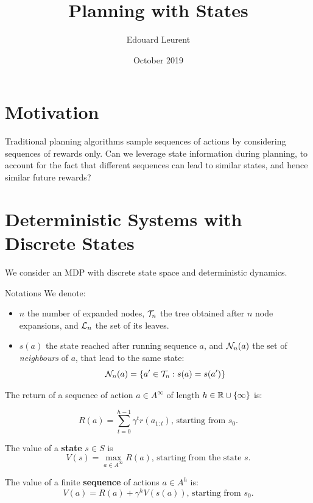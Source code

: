 \documentclass{article}
\title{Planning with States}
\author{Edouard Leurent}
\date{October 2019}
\begin{document}
\maketitle

\tableofcontents

\section{Motivation}

Traditional planning algorithms sample sequences of actions by considering sequences of rewards only. Can we leverage state information during planning, to account for the fact that different sequences can lead to similar states, and hence similar future rewards?

\section{Deterministic Systems with Discrete States}

We consider an MDP with discrete state space and deterministic dynamics.

\begin{paragraph}{Notations}
We denote:
\begin{itemize}
\item $n$ the number of expanded nodes, $\mathcal{T}_n$ the tree obtained after $n$ node expansions, and $\mathcal{L}_n$ the set of its leaves.
    \item $s(a)$ the state reached after running sequence $a$, and $\mathcal{N}_n(a)$ the set of \emph{neighbours} of $a$, that lead to the same state:  \[\mathcal{N}_n(a) = \{a'\in\mathcal{T}_n: s(a)=s(a')\}\]
\end{itemize}
\end{paragraph}

\begin{definition}[Values]
The return of a sequence of action $a\in A^\infty$ of length $h\in\mathbb{R}\cup\{\infty\}$ is:

\[R(a) = \sum_{t=0}^{h-1} \gamma^t r(a_{1:t}) ,\, \text{starting from $s_0$.}\]

The value of a \textbf{state} $s\in S$ is
\begin{equation}
    V(s) = \max_{a\in A^\infty} R(a),\, \text{starting from the state $s$.}
\end{equation}

The value of a finite \textbf{sequence} of actions $a\in A^h$ is:
\begin{equation}
\label{eq:state_value}
    V(a) = R(a) + \gamma^{h} V(s(a)),\, \text{starting from $s_0$.}
\end{equation}
\end{definition}
\end{document}
